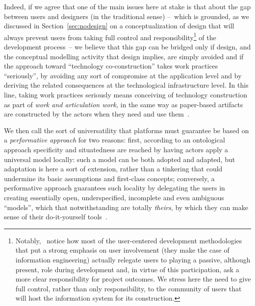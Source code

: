 \documentclass{article}
\begin{document}
Indeed, if we agree that one of the main issues here at stake is that about the gap between users and designers (in the traditional sense) --~which is grounded, as we discussed in Section~\ref{sec:nodesign} on a conceptualization of design that will always prevent users from taking full control and responsibility\footnote{Notably,~\citet{beath_contradictory_1994} notice how most of the user-centered development methodologies that put a strong emphasis on user involvement (they make the case of information engineering) actually relegate users to playing a passive, although present, role during development and, in virtue of this participation, ask a more clear responsibility for project outcomes. We stress here the need to give full control, rather than only responsibility, to the community of users that will host the information system for its construction.} of the development process~-- we believe that this gap can be bridged only if design, and the conceptual modelling activity that design implies, are simply avoided and if the approach toward ``technology co-construction'' takes work practices ``seriously'', by avoiding any sort of compromise at the application level and by deriving the related consequences at the technological infrastructure level. In this line, taking work practices seriously means conceiving of technology construction as part of \emph{work and articulation work}, in the same way as paper-based artifacts are constructed by the actors when they need and use them~\citep[e.g.,][]{morrison_observing_2009}. 

We then call the sort of universatility that platforms must guarantee be based on a \emph{performative approach} for two reasons: first, according to an ontological approach specificity and situatedness are reached by having actors apply a universal model locally: such a model can be both adopted and adapted, but adaptation is here a sort of extension, rather than a tinkering that could undermine its basic assumptions and first-class concepts; conversely, a performative approach guarantees such locality by delegating the users in creating essentially open, underspecified, incomplete and even ambiguous ``models'', which that notwithstanding are totally \emph{theirs}, by which they can make sense of their do-it-yourself tools~\citep{cabitza_leveraging_2012,cabitza_supporting_2012}. 
\end{document}
